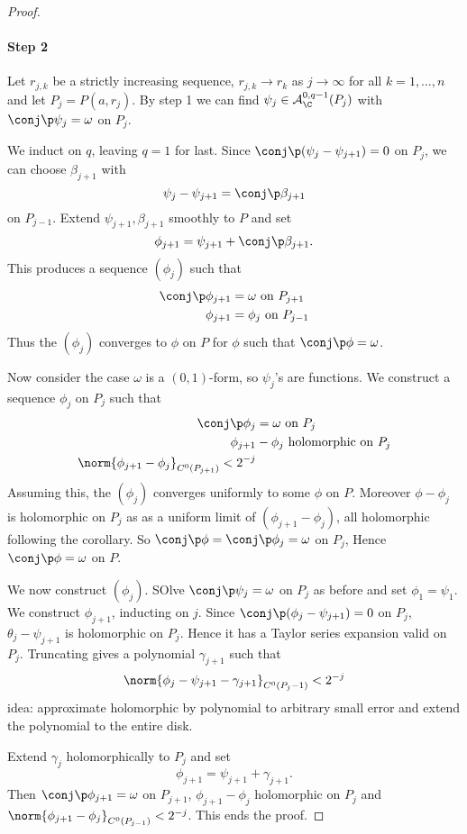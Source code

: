 \documentclass[a4paper]{article}
\begin{document}
\begin{proof}
  \paragraph{Step 2}
  Let \(r_{j, k}\) be a strictly increasing sequence, \(r_{j, k} \to r_k\) as \(j \to \infty\) for all \(k = 1, \dots, n\) and let \(P_j = P(a, r_j)\). By step 1 we can find \(\psi_j \in \mathcal A_\C^{0, q - 1}(P_j)\) with \(\conj \p \psi_j = \omega\) on \(P_j\).

  We induct on \(q\), leaving \(q = 1\) for last. Since \(\conj \p(\psi_j - \psi_{j + 1}) = 0\) on \(P_j\), we can choose \(\beta_{j + 1}\) with
  \[
    \psi_j - \psi_{j + 1} = \conj \p \beta_{j + 1}
  \]
  on \(P_{j - 1}\). Extend \(\psi_{j + 1}, \beta_{j + 1}\) smoothly to \(P\) and set
  \[
    \phi_{j + 1} = \psi_{j + 1} + \conj \p \beta_{j + 1}.
  \]
  This produces a sequence \((\phi_j)\) such that
  \begin{align*}
    \conj \p \phi_{j + 1} &= \omega \text{ on } P_{j + 1} \\
    \phi_{j + 1} &= \phi_j \text{ on } P_{j - 1}
  \end{align*}
  Thus the \((\phi_j)\) converges to \(\phi\) on \(P\) for \(\phi\) such that \(\conj \p \phi = \omega\).

  Now consider the case \(\omega\) is a \((0, 1)\)-form, so \(\psi_j\)'s are functions. We construct a sequence \(\phi_j\) on \(P_j\) such that
  \begin{align*}
    \conj \p \phi_j &= \omega \text{ on } P_j \\
    \phi_{j + 1} &- \phi_j \text{ holomorphic on } P_j \\
    \norm{\phi_{j + 1} - \phi_j}_{C^0(P_{j + 1})} < 2^{-j}
  \end{align*}
  Assuming this, the \((\phi_j)\) converges uniformly to some \(\phi\) on \(P\). Moreover \(\phi - \phi_j\) is holomorphic on \(P_j\) as as a uniform limit of \((\phi_{j + 1} - \phi_j)\), all holomorphic following the corollary. So \(\conj \p \phi = \conj \p \phi_j = \omega\) on \(P_j\), Hence \(\conj \p \phi = \omega\) on \(P\).

  We now construct \((\phi_j)\). SOlve \(\conj \p \psi_j = \omega\) on \(P_j\) as before and set \(\phi_1 = \psi_1\). We construct \(\phi_{j + 1}\), inducting on \(j\). Since \(\conj \p(\phi_j - \psi_{j + 1}) = 0\) on \(P_j\), \(\theta_j - \psi_{j + 1}\) is holomorphic on \(P_j\). Hence it has a Taylor series expansion valid on \(P_j\). Truncating gives a polynomial \(\gamma_{j + 1}\) such that
  \[
    \norm{\phi_j - \psi_{j + 1} - \gamma_{j + 1}}_{C^0(P_j - 1)} < 2^{-j}
  \]
  idea: approximate holomorphic by polynomial to arbitrary small error and extend the polynomial to the entire disk.

  Extend \(\gamma_j\) holomorphically to \(P_j\) and set
  \[
    \phi_{j + 1} = \psi_{j + 1} + \gamma_{j + 1}.
  \]
  Then \(\conj \p \phi_{j + 1} = \omega\) on \(P_{j + 1}\), \(\phi_{j + 1} - \phi_j\) holomorphic on \(P_j\) and \(\norm{\phi_{j + 1} - \phi_j}_{C^0(P_{j - 1})} < 2^{-j}\). This ends the proof.
\end{proof}
\end{document}
